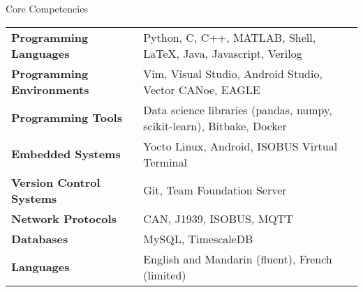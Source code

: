 \documentclass{resume}
\begin{document}
  \begin{rSection}{Core Competencies}
    \begin{tabular}{ @{} >{\bfseries}l @{\hspace{6ex}} l }
      Programming Languages & Python, C, C++, MATLAB, Shell, \LaTeX, Java,
        Javascript, Verilog \\
      Programming Environments & Vim, Visual Studio, Android Studio, Vector
        CANoe, EAGLE \\
      Programming Tools & Data science libraries (pandas, numpy, scikit-learn),
        Bitbake, Docker \\
      Embedded Systems & Yocto Linux, Android, ISOBUS Virtual Terminal \\
      Version Control Systems & Git, Team Foundation Server \\
      Network Protocols & CAN, J1939, ISOBUS, MQTT \\
      Databases & MySQL, TimescaleDB \\
      Languages & English and Mandarin (fluent), French (limited) \\
    \end{tabular}
  \end{rSection}
\end{document}

